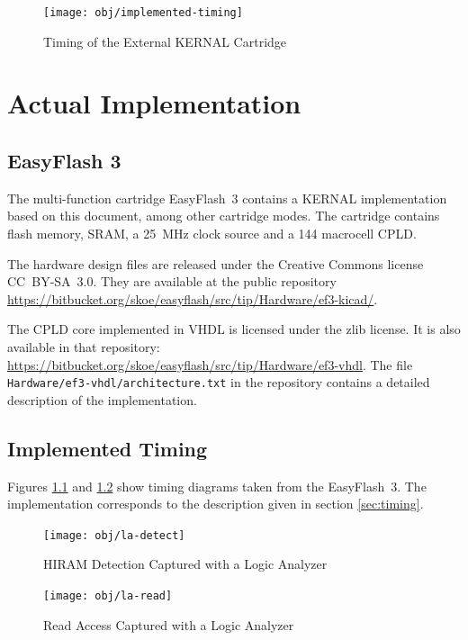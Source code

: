 \documentclass[a4paper,oneside]{memoir}
\begin{document}
\begin{figure}
    \centering
    \texttt{[image: obj/implemented-timing]}
    \caption{Timing of the External KERNAL Cartridge}
    \label{fig:timing}
\end{figure}

\chapter{Actual Implementation}

\section{EasyFlash 3}

\label{sec:ef3} The multi-function cartridge EasyFlash~3 contains a KERNAL implementation based on this document, among other cartridge modes.
The cartridge contains flash memory, SRAM, a 25~MHz clock source and a 144 macrocell CPLD.

The hardware design files are released under the Creative Commons license CC~BY-SA~3.0.
They are available at the public repository
\url{https://bitbucket.org/skoe/easyflash/src/tip/Hardware/ef3-kicad/}.

The CPLD core implemented in VHDL is licensed under the zlib license.
It is also available in that repository:
\url{https://bitbucket.org/skoe/easyflash/src/tip/Hardware/ef3-vhdl}.
The file \texttt{Hardware/ef3-vhdl/architecture.txt} in the repository contains a
detailed description of the implementation.

\section{Implemented Timing}

Figures \ref{fig:la-detect} and \ref{fig:la-read} show timing diagrams taken from the EasyFlash~3.
The implementation corresponds to the description given in section \ref{sec:timing}.

\begin{figure}
    \centering
    \texttt{[image: obj/la-detect]}
    \caption{HIRAM Detection Captured with a Logic Analyzer}
    \label{fig:la-detect}
\end{figure}

\begin{figure}
    \centering
    \texttt{[image: obj/la-read]}
    \caption{Read Access Captured with a Logic Analyzer}
    \label{fig:la-read}
\end{figure}
\end{document}
